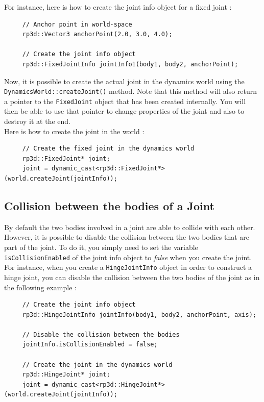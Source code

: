 \documentclass[a4paper,12pt]{article}
\begin{document}
    For instance, here is how to create the joint info object for a fixed joint : \\

    \begin{lstlisting}
     // Anchor point in world-space
     rp3d::Vector3 anchorPoint(2.0, 3.0, 4.0);

     // Create the joint info object
     rp3d::FixedJointInfo jointInfo1(body1, body2, anchorPoint);
  \end{lstlisting}

    \vspace{0.6cm}

    Now, it is possible to create the actual joint in the dynamics world using the \texttt{DynamicsWorld::createJoint()} method.
    Note that this method will also return a pointer to the \texttt{FixedJoint} object that has been created internally. You will then
    be able to use that pointer to change properties of the joint and also to destroy it at the end. \\

    Here is how to create the joint in the world : \\

    \begin{lstlisting}
     // Create the fixed joint in the dynamics world
     rp3d::FixedJoint* joint;
     joint = dynamic_cast<rp3d::FixedJoint*>(world.createJoint(jointInfo));
  \end{lstlisting}

    \subsection{Collision between the bodies of a Joint}

    By default the two bodies involved in a joint are able to collide with each other. However, it is possible to disable the collision between the two bodies that are part
    of the joint. To do it, you simply need to set the variable \texttt{isCollisionEnabled} of the joint info object to \emph{false} when you create the joint. \\

    For instance, when you create a \texttt{HingeJointInfo} object in order to construct a hinge joint, you can disable the collision between the two bodies of the joint as in the
    following example : \\

    \begin{lstlisting}
     // Create the joint info object
     rp3d::HingeJointInfo jointInfo(body1, body2, anchorPoint, axis);

     // Disable the collision between the bodies
     jointInfo.isCollisionEnabled = false;

     // Create the joint in the dynamics world
     rp3d::HingeJoint* joint;
     joint = dynamic_cast<rp3d::HingeJoint*>(world.createJoint(jointInfo));
  \end{lstlisting}
\end{document}
